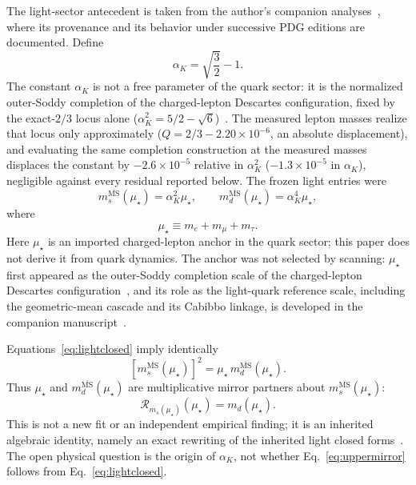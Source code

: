 \documentclass[aps,twocolumn,superscriptaddress,nofootinbib,floatfix]{revtex4-2}
\newcommand{\MSbar}{\overline{\mathrm{MS}}}
\newcommand{\mstar}{\mu_\star}
\newcommand{\alphaK}{\alpha_K}
\newcommand{\RR}{\mathcal R}
\begin{document}
The light-sector antecedent is taken from the author's companion analyses~\cite{BrilliantMPLA,BrilliantAPPB}, where its provenance and its behavior under successive PDG editions are documented. Define
\begin{equation}
\alphaK=\sqrt{\frac32}-1.
\label{eq:alpha}
\end{equation}
The constant $\alphaK$ is not a free parameter of the quark sector: it is the normalized outer-Soddy completion of the charged-lepton Descartes configuration, fixed by the exact-$2/3$ locus alone ($\alphaK^2=5/2-\sqrt6$)~\cite{BrilliantAPPB,BrilliantMPLA}. The measured lepton masses realize that locus only approximately ($Q=2/3-2.20\times10^{-6}$, an absolute displacement), and evaluating the same completion construction at the measured masses displaces the constant by $-2.6\times10^{-5}$ relative in $\alphaK^2$ ($-1.3\times10^{-5}$ in $\alphaK$), negligible against every residual reported below.
The frozen light entries were
\begin{equation}
m_s^{\MSbar}(\mstar)=\alphaK^2\mstar,
\qquad
m_d^{\MSbar}(\mstar)=\alphaK^4\mstar,
\label{eq:lightclosed}
\end{equation}
where
\begin{equation}
\mstar\equiv m_e+m_\mu+m_\tau.
\end{equation}
Here $\mstar$ is an imported charged-lepton anchor in the quark sector; this paper does not derive it from quark dynamics. The anchor was not selected by scanning: $\mstar$ first appeared as the outer-Soddy completion scale of the charged-lepton Descartes configuration~\cite{Kocik2012,BrilliantAPPB}, and its role as the light-quark reference scale, including the geometric-mean cascade and its Cabibbo linkage, is developed in the companion manuscript~\cite{BrilliantMPLA}.

Equations~\eqref{eq:lightclosed} imply identically
\begin{equation}
\boxed{[m_s^{\MSbar}(\mstar)]^2=\mstar\,m_d^{\MSbar}(\mstar).}
\label{eq:uppermirror}
\end{equation}
Thus $\mstar$ and $m_d^{\MSbar}(\mstar)$ are multiplicative mirror partners about $m_s^{\MSbar}(\mstar)$:
\begin{equation}
\boxed{\RR_{m_s(\mstar)}(\mstar)=m_d(\mstar).}
\label{eq:Rupper}
\end{equation}
This is not a new fit or an independent empirical finding; it is an inherited algebraic identity, namely an exact rewriting of the inherited light closed forms~\cite{BrilliantMPLA}. The open physical question is the origin of $\alphaK$, not whether Eq.~\eqref{eq:uppermirror} follows from Eq.~\eqref{eq:lightclosed}.
\end{document}
